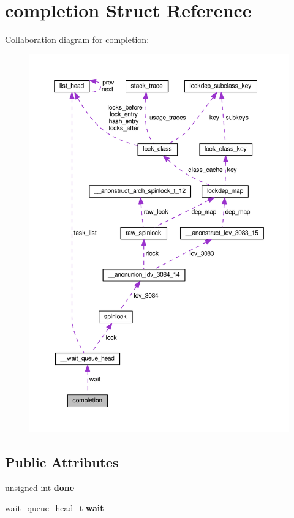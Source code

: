 \hypertarget{structcompletion}{}\section{completion Struct Reference}
\label{structcompletion}


Collaboration diagram for completion\+:
\nopagebreak
\begin{figure}[H]
\begin{center}
\leavevmode
\includegraphics[width=350pt]{structcompletion__coll__graph}
\end{center}
\end{figure}
\subsection*{Public Attributes}
\begin{DoxyCompactItemize}
\item 
\hypertarget{structcompletion_af95c36316cdb91fd1dc275989c4dd43a}{}unsigned int {\bfseries done}\label{structcompletion_af95c36316cdb91fd1dc275989c4dd43a}

\item 
\hypertarget{structcompletion_a1c4b2ec501a33e8432e563fc8662cc94}{}\hyperlink{struct____wait__queue__head}{wait\+\_\+queue\+\_\+head\+\_\+t} {\bfseries wait}\label{structcompletion_a1c4b2ec501a33e8432e563fc8662cc94}

\end{DoxyCompactItemize}


